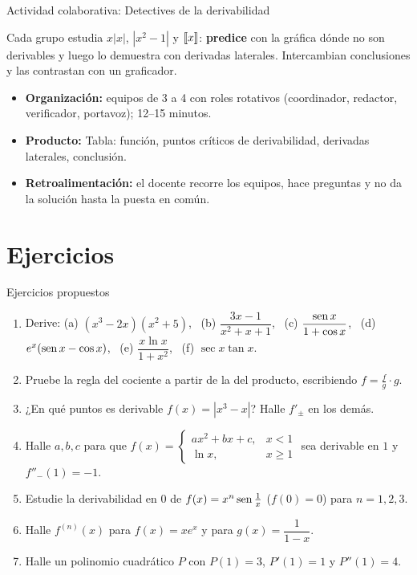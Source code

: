 \documentclass[10pt,aspectratio=169]{beamer}
\begin{document}
\begin{frame}{Actividad colaborativa: Detectives de la derivabilidad}
  \small
  \begin{activa}
    Cada grupo estudia $x|x|$, $|x^2-1|$ y $\left\llbracket x\right\rrbracket$: \textbf{predice} con la gráfica dónde no son derivables y luego lo demuestra con derivadas laterales. Intercambian conclusiones y las contrastan con un graficador.
  \end{activa}
  \begin{itemize}
    \item \textbf{Organización:} equipos de 3 a 4 con roles rotativos (coordinador, redactor, verificador, portavoz); 12--15 minutos.
    \item \textbf{Producto:} Tabla: función, puntos críticos de derivabilidad, derivadas laterales, conclusión.
    \item \textbf{Retroalimentación:} el docente recorre los equipos, hace preguntas y no da la solución hasta la puesta en común.
  \end{itemize}
\end{frame}

\section{Ejercicios}

\begin{frame}{Ejercicios propuestos}
  \small
  \begin{ejercicio}
    \begin{enumerate}
      \item Derive: (a) $(x^3-2x)(x^2+5)$, \ (b) $\dfrac{3x-1}{x^2+x+1}$, \ (c) $\dfrac{\operatorname{sen} x}{1+\cos x}$, \ (d) $e^x(\operatorname{sen} x-\cos x)$,
        \ (e) $\dfrac{x\ln x}{1+x^2}$, \ (f) $\sec x\tan x$.
      \item Pruebe la regla del cociente a partir de la del producto, escribiendo $f=\frac fg\cdot g$.
      \item ¿En qué puntos es derivable $f(x)=|x^3-x|$? Halle $f'_\pm$ en los demás.
      \item Halle $a,b,c$ para que $f(x)=\begin{cases}ax^2+bx+c,&x<1\\ \ln x,&x\ge1\end{cases}$ sea derivable en $1$ y $f''_-(1)=-1$.
      \item Estudie la derivabilidad en $0$ de $f(x)=x^n\operatorname{sen}\frac1x$ ($f(0)=0$) para $n=1,2,3$.
      \item Halle $f^{(n)}(x)$ para $f(x)=xe^x$ y para $g(x)=\dfrac{1}{1-x}$.
      \item Halle un polinomio cuadrático $P$ con $P(1)=3$, $P'(1)=1$ y $P''(1)=4$.
    \end{enumerate}
  \end{ejercicio}
\end{frame}
\end{document}
